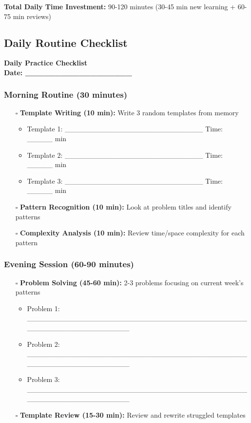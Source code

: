 \documentclass[10pt,a4paper]{article}
\begin{document}
\textbf{Total Daily Time Investment:} 90-120 minutes (30-45 min new learning + 60-75 min reviews)

\newpage

\subsection{Daily Routine Checklist}

\begin{center}
\textbf{\Large Daily Practice Checklist}\\
\textbf{Date: \_\_\_\_\_\_\_\_\_\_\_\_\_\_\_\_\_\_}
\end{center}

\subsubsection{Morning Routine (30 minutes)}
\begin{itemize}
\item[$\square$] \textbf{Template Writing (10 min):} Write 3 random templates from memory
  \begin{itemize}
  \item Template 1: \_\_\_\_\_\_\_\_\_\_\_\_\_\_\_\_\_\_\_\_\_\_\_\_\_\_\_ Time: \_\_\_\_\_ min
  \item Template 2: \_\_\_\_\_\_\_\_\_\_\_\_\_\_\_\_\_\_\_\_\_\_\_\_\_\_\_ Time: \_\_\_\_\_ min
  \item Template 3: \_\_\_\_\_\_\_\_\_\_\_\_\_\_\_\_\_\_\_\_\_\_\_\_\_\_\_ Time: \_\_\_\_\_ min
  \end{itemize}
\item[$\square$] \textbf{Pattern Recognition (10 min):} Look at problem titles and identify patterns
\item[$\square$] \textbf{Complexity Analysis (10 min):} Review time/space complexity for each pattern
\end{itemize}

\subsubsection{Evening Session (60-90 minutes)}
\begin{itemize}
\item[$\square$] \textbf{Problem Solving (45-60 min):} 2-3 problems focusing on current week's patterns
  \begin{itemize}
  \item Problem 1: \_\_\_\_\_\_\_\_\_\_\_\_\_\_\_\_\_\_\_\_\_\_\_\_\_\_\_\_\_\_\_\_\_\_\_\_\_\_\_\_\_\_\_\_\_\_\_\_\_\_\_\_\_\_\_\_\_\_\_\_\_\_\_
  \item Problem 2: \_\_\_\_\_\_\_\_\_\_\_\_\_\_\_\_\_\_\_\_\_\_\_\_\_\_\_\_\_\_\_\_\_\_\_\_\_\_\_\_\_\_\_\_\_\_\_\_\_\_\_\_\_\_\_\_\_\_\_\_\_\_\_
  \item Problem 3: \_\_\_\_\_\_\_\_\_\_\_\_\_\_\_\_\_\_\_\_\_\_\_\_\_\_\_\_\_\_\_\_\_\_\_\_\_\_\_\_\_\_\_\_\_\_\_\_\_\_\_\_\_\_\_\_\_\_\_\_\_\_\_
  \end{itemize}
\item[$\square$] \textbf{Template Review (15-30 min):} Review and rewrite struggled templates
\end{itemize}
\end{document}
